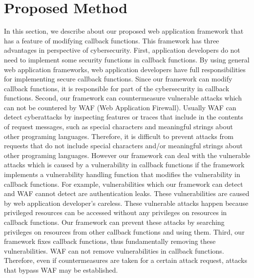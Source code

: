 \documentclass[conference]{IEEEtran}
\begin{document}
\section{Proposed Method}
In this section, we describe about our proposed web application framework that has a feature of modifying callback functions.
This framework has three advantages in perspective of  cybersecurity.
First, application developers do not need to implement some security functions in callback functions.
By using general web application frameworks, web application developers have full responsibilities for implementing secure callback functions.
Since our framework can modify callback functions, it is responsible for part of the cybersecurity in callback functions.
Second, our framework can countermeasure vulnerable attacks which can not be countered by WAF (Web Application Firewall).
Usually WAF can detect cyberattacks by inspecting features or traces that include in the contents of request messages, such as special characters and meaningful strings about other programing languages.
Therefore, it is difficult to prevent attacks from requests that do not include special characters and/or meaningful strings about other programing languages.
However our framework can deal with the vulnerable attacks which is caused by a vulnerability in callback functions if the framework implements a vulnerability handling function that modifies the vulnerability in callback functions.
For example, vulnerabilities which our framework can detect and WAF cannot detect are  authentication leaks.
These vulnerabilities are caused by web application developer’s careless.
These vulnerable attacks happen because privileged resources can be accessed without any privileges on resources in callback functions.
Our framework can prevent these attacks by searching privileges on resources from other callback functions and using them.
Third, our framework fixes callback functions, thus fundamentally removing these vulnerabilities.
WAF can not remove vulnerabilities in callback functions.
Therefore, even if countermeasures are taken for a certain attack request,  attacks that bypass WAF may be established.
\end{document}
